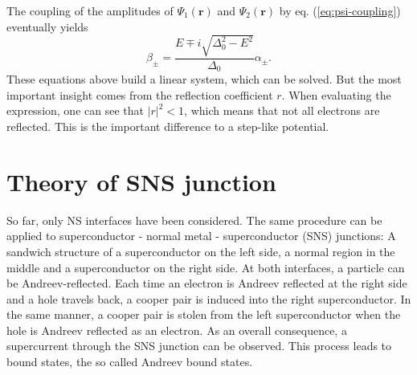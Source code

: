 The coupling of the amplitudes of $\Psi_1 \left( \mathbf{r} \right)$ and $\Psi_2 \left( \mathbf{r} \right)$ by eq. (\ref{eq:psi-coupling}) eventually yields
\begin{equation}
\beta_\pm = \frac{E \mp i \sqrt{\Delta_0^2 - E^2}}{\Delta_0}\alpha_\pm.
\end{equation}
These equations above build a linear system, which can be solved. But the most important insight comes from the reflection coefficient $r$. When evaluating the expression, one can see that $|r|^2 < 1$, which means that not all electrons are reflected. This is the important difference to a step-like potential.

\section{Theory of SNS junction}
So far, only NS interfaces have been considered. The same procedure can be applied to superconductor - normal metal - superconductor (SNS) junctions: A sandwich structure of a superconductor on the left side, a normal region in the middle and a superconductor on the right side. At both interfaces, a particle can be Andreev-reflected.
Each time an electron is Andreev reflected at the right side and a hole travels back, a cooper pair is induced into the right superconductor. In the same manner, a cooper pair is stolen from the left superconductor when the hole is Andreev reflected as an electron. As an overall consequence, a supercurrent through the SNS junction can be observed. This process leads to bound states, the so called Andreev bound states. \\

